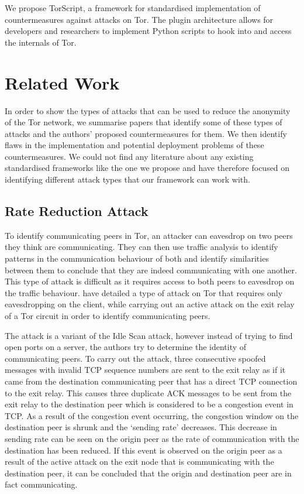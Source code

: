 \documentclass[9pt,technote]{IEEEtran}
\begin{document}
We propose TorScript, a framework for standardised implementation of
countermeasures against attacks on Tor. The plugin architecture allows for
developers and researchers to implement Python scripts to hook into and access
the internals of Tor.

\cite{hayesguard}\cite{gilad2012spying}\cite{sun2015raptor}\cite{biryukov2012torscan}\cite{jansen2014sniper}\cite{tor}

\section{Related Work} 
\label{sec:relatedwork}
In order to show the types of attacks that can be used to reduce the anonymity of the Tor network, we summarise papers that identify some of these types of attacks and the authors' proposed countermeasures for them. We then identify flaws in the implementation and potential deployment problems of these countermeasures. We could not find any literature about any existing standardised frameworks like the one we propose and have therefore focused on identifying different attack types that our framework can work with.\\

\subsection{Rate Reduction Attack}
To identify communicating peers in Tor, an attacker can eavesdrop on two peers they think are communicating. They can then use traffic analysis to identify patterns in the communication behaviour of both and identify similarities between them to conclude that they are indeed communicating with one another. This type of attack is difficult as it requires access to both peers to eavesdrop on the traffic behaviour. \citeauthor{gilad2012spying} have detailed a type of attack on Tor that requires only eavesdropping on the client, while carrying out an active attack on the exit relay of a Tor circuit in order to identify communicating peers.

The attack is a variant of the Idle Scan attack, however instead of trying to find open ports on a server, the authors try to determine the identity of communicating peers. To carry out the attack, three consecutive spoofed messages with invalid TCP sequence numbers are sent to the exit relay as if it came from the destination communicating peer that has a direct TCP connection to the exit relay. This causes three duplicate ACK messages to be sent from the exit relay to the destination peer which is considered to be a congestion event in TCP. As a result of the congestion event occurring, the congestion window on the destination peer is shrunk and the `sending rate' decreases. This decrease in sending rate can be seen on the origin peer as the rate of communication with the destination has been reduced. If this event is observed on the origin peer as a result of the active attack on the exit node that is communicating with the destination peer, it can be concluded that the origin and destination peer are in fact communicating.
\end{document}
